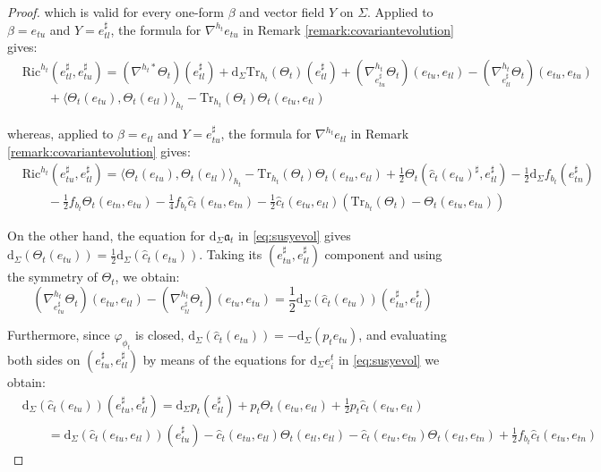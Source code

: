 \documentclass[10pt,reqno,a4paper]{amsart}
\theoremstyle{plain}
\theoremstyle{definition}
\theoremstyle{remark}
\theoremstyle{remark}
\def\dd{\mathrm{d}}
\newcommand{\Tr}{\mathrm{Tr}}
\def\fra{\mathfrak{a}}
\newcommand{\Ric}{\mathrm{Ric}}
\renewcommand{\(}{ (}
\renewcommand{\)}{ )}
\begin{document}
\begin{proof}
\noindent
which is valid for every one-form $\beta$ and vector field $Y$ on $\Sigma$. Applied to $\beta = e_{tu}$ and $Y = e^{\sharp}_{tl}$, the formula for $\nabla^{h_t}e_{tu}$ in Remark \ref{remark:covariantevolution} gives:
\begin{eqnarray*}
& \Ric^{h_t}(e^{\sharp}_{tl},e^{\sharp}_{tu}) = (\nabla^{h_t\ast}\Theta_t)(e^{\sharp}_{tl}) + \dd_{\Sigma}\Tr_{h_t}(\Theta_t)(e^{\sharp}_{tl}) + (\nabla^{h_t}_{e^{\sharp}_{tu}}\Theta_t)(e_{tu},e_{tl}) - (\nabla^{h_t}_{e^{\sharp}_{tl}}\Theta_t)(e_{tu},e_{tu}) \\
& \qquad + \langle \Theta_t(e_{tu}),\Theta_t(e_{tl})\rangle_{h_t} - \Tr_{h_t}(\Theta_t)\Theta_t(e_{tu},e_{tl})
\end{eqnarray*}

\noindent
whereas, applied to $\beta = e_{tl}$ and $Y = e^{\sharp}_{tu}$, the formula for $\nabla^{h_t}e_{tl}$ in Remark \ref{remark:covariantevolution} gives:
\begin{eqnarray*}
& \Ric^{h_t}(e^{\sharp}_{tu},e^{\sharp}_{tl}) = \langle \Theta_t(e_{tu}),\Theta_t(e_{tl})\rangle_{h_t} - \Tr_{h_t}(\Theta_t)\Theta_t(e_{tu},e_{tl}) + \frac{1}{2}\Theta_t(\widehat{c}_t (e_{tu})^{\sharp},e^{\sharp}_{tl}) - \frac{1}{2}\dd_{\Sigma} f_{b_t}(e^{\sharp}_{tn}) \\
& \qquad - \frac{1}{2} f_{b_t}\Theta_t(e_{tn},e_{tu}) - \frac{1}{4} f_{b_t}\widehat{c}_t (e_{tu},e_{tn}) - \frac{1}{2}\widehat{c}_t (e_{tu},e_{tl}) (\Tr_{h_t}(\Theta_t) - \Theta_t(e_{tu},e_{tu}) )
\end{eqnarray*}

\noindent
On the other hand, the equation for $\dd_{\Sigma}\fra_t$ in \eqref{eq:susyevol} gives $\dd_{\Sigma}(\Theta_t(e_{tu})) = \frac{1}{2}\dd_{\Sigma}(\widehat{c}_t (e_{tu}))$. Taking its $(e^{\sharp}_{tu},e^{\sharp}_{tl})$ component and using the symmetry of $\Theta_t$, we obtain:
\begin{equation*}
(\nabla^{h_t}_{e^{\sharp}_{tu}}\Theta_t)(e_{tu},e_{tl}) - (\nabla^{h_t}_{e^{\sharp}_{tl}}\Theta_t)(e_{tu},e_{tu}) = \frac{1}{2}\dd_{\Sigma}(\widehat{c}_t (e_{tu}))(e^{\sharp}_{tu},e^{\sharp}_{tl})
\end{equation*}

\noindent
Furthermore, since $\varphi_{\phi_t}$ is closed, $\dd_{\Sigma}(\widehat{c}_t (e_{tu})) = - \dd_{\Sigma}(p_t e_{tu})$, and evaluating both sides on $(e^{\sharp}_{tu},e^{\sharp}_{tl})$ by means of the equations for $\dd_{\Sigma} e^t_i$ in \eqref{eq:susyevol} we obtain:
\begin{eqnarray*}
& \dd_{\Sigma}(\widehat{c}_t (e_{tu}))(e^{\sharp}_{tu},e^{\sharp}_{tl}) = \dd_{\Sigma}p_t(e^{\sharp}_{tl}) + p_t\Theta_t(e_{tu},e_{tl}) + \frac{1}{2}p_t \widehat{c}_t (e_{tu},e_{tl}) \\
& \qquad = \dd_{\Sigma}(\widehat{c}_t (e_{tu},e_{tl}))(e^{\sharp}_{tu}) - \widehat{c}_t (e_{tu},e_{tl})\Theta_t(e_{tl},e_{tl}) - \widehat{c}_t (e_{tu},e_{tn})\Theta_t(e_{tl},e_{tn}) + \frac{1}{2} f_{b_t}\widehat{c}_t (e_{tu},e_{tn})
\end{eqnarray*}


\end{proof}
\end{document}
